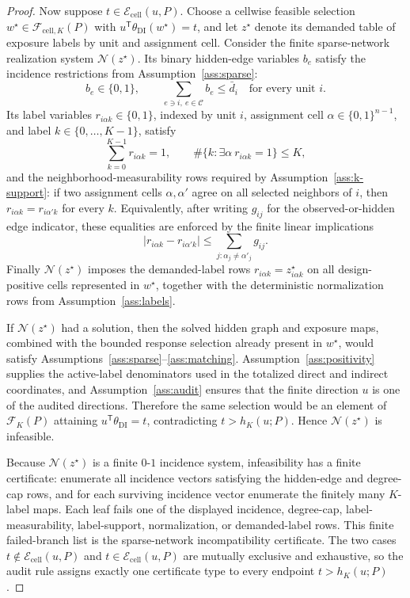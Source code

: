 \documentclass[11pt]{article}
\newcommand{\transpose}{\mathsf{T}}
\theoremstyle{definition}
\theoremstyle{plain}
\theoremstyle{remark}
\begin{document}
\begin{proof}
Now suppose \(t\in\mathcal E_{\mathrm{cell}}(u,P)\).  Choose a cellwise feasible selection \(w^\star\in\mathcal F_{\mathrm{cell},K}(P)\) with \(u^\transpose\theta_{\mathrm{DI}}(w^\star)=t\), and let \(z^\star\) denote its demanded table of exposure labels by unit and assignment cell.  Consider the finite sparse-network realization system \(\mathcal N(z^\star)\).  Its binary hidden-edge variables \(b_e\) satisfy the incidence restrictions from Assumption~\ref{ass:sparse}:
\[
b_e\in\{0,1\},\qquad
\sum_{e\ni i,\ e\in\mathcal C} b_e\le \bar d_i
\quad\text{for every unit }i.
\]
Its label variables \(r_{i\alpha k}\in\{0,1\}\), indexed by unit \(i\), assignment cell \(\alpha\in\{0,1\}^{n-1}\), and label \(k\in\{0,\ldots,K-1\}\), satisfy
\[
\sum_{k=0}^{K-1}r_{i\alpha k}=1,\qquad
\#\{k:\exists\alpha\ r_{i\alpha k}=1\}\le K,
\]
and the neighborhood-measurability rows required by Assumption~\ref{ass:k-support}: if two assignment cells \(\alpha,\alpha'\) agree on all selected neighbors of \(i\), then \(r_{i\alpha k}=r_{i\alpha'k}\) for every \(k\).  Equivalently, after writing \(g_{ij}\) for the observed-or-hidden edge indicator, these equalities are enforced by the finite linear implications
\[
|r_{i\alpha k}-r_{i\alpha'k}|
\le
\sum_{j:\alpha_j\ne\alpha'_j} g_{ij}.
\]
Finally \(\mathcal N(z^\star)\) imposes the demanded-label rows \(r_{i\alpha k}=z^\star_{i\alpha k}\) on all design-positive cells represented in \(w^\star\), together with the deterministic normalization rows from Assumption~\ref{ass:labels}.

If \(\mathcal N(z^\star)\) had a solution, then the solved hidden graph and exposure maps, combined with the bounded response selection already present in \(w^\star\), would satisfy Assumptions~\ref{ass:sparse}--\ref{ass:matching}.  Assumption~\ref{ass:positivity} supplies the active-label denominators used in the totalized direct and indirect coordinates, and Assumption~\ref{ass:audit} ensures that the finite direction \(u\) is one of the audited directions.  Therefore the same selection would be an element of \(\mathcal F_K(P)\) attaining \(u^\transpose\theta_{\mathrm{DI}}=t\), contradicting \(t>h_K(u;P)\).  Hence \(\mathcal N(z^\star)\) is infeasible.

Because \(\mathcal N(z^\star)\) is a finite \(0\)-\(1\) incidence system, infeasibility has a finite certificate: enumerate all incidence vectors satisfying the hidden-edge and degree-cap rows, and for each surviving incidence vector enumerate the finitely many \(K\)-label maps.  Each leaf fails one of the displayed incidence, degree-cap, label-measurability, label-support, normalization, or demanded-label rows.  This finite failed-branch list is the sparse-network incompatibility certificate.  The two cases \(t\notin\mathcal E_{\mathrm{cell}}(u,P)\) and \(t\in\mathcal E_{\mathrm{cell}}(u,P)\) are mutually exclusive and exhaustive, so the audit rule assigns exactly one certificate type to every endpoint \(t>h_K(u;P)\).


\end{proof}
\end{document}
